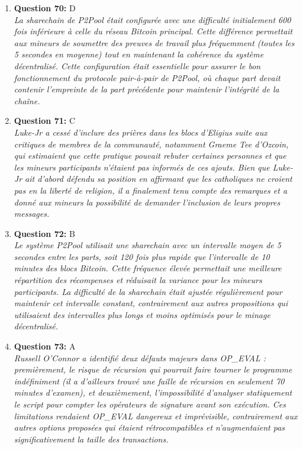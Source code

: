 \documentclass[12pt,a4paper]{article}
\begin{document}
\begin{enumerate}
\item \textbf{Question 70:} D
\\ \textit{La sharechain de P2Pool était configurée avec une difficulté initialement 600 fois inférieure à celle du réseau Bitcoin principal. Cette différence permettait aux mineurs de soumettre des preuves de travail plus fréquemment (toutes les 5 secondes en moyenne) tout en maintenant la cohérence du système décentralisé. Cette configuration était essentielle pour assurer le bon fonctionnement du protocole pair-à-pair de P2Pool, où chaque part devait contenir l'empreinte de la part précédente pour maintenir l'intégrité de la chaîne.}

\item \textbf{Question 71:} C
\\ \textit{Luke-Jr a cessé d'inclure des prières dans les blocs d'Eligius suite aux critiques de membres de la communauté, notamment Graeme Tee d'Ozcoin, qui estimaient que cette pratique pouvait rebuter certaines personnes et que les mineurs participants n'étaient pas informés de ces ajouts. Bien que Luke-Jr ait d'abord défendu sa position en affirmant que les catholiques ne croient pas en la liberté de religion, il a finalement tenu compte des remarques et a donné aux mineurs la possibilité de demander l'inclusion de leurs propres messages.}

\item \textbf{Question 72:} B
\\ \textit{Le système P2Pool utilisait une sharechain avec un intervalle moyen de 5 secondes entre les parts, soit 120 fois plus rapide que l'intervalle de 10 minutes des blocs Bitcoin. Cette fréquence élevée permettait une meilleure répartition des récompenses et réduisait la variance pour les mineurs participants. La difficulté de la sharechain était ajustée régulièrement pour maintenir cet intervalle constant, contrairement aux autres propositions qui utilisaient des intervalles plus longs et moins optimisés pour le minage décentralisé.}

\item \textbf{Question 73:} A
\\ \textit{Russell O'Connor a identifié deux défauts majeurs dans OP_EVAL : premièrement, le risque de récursion qui pourrait faire tourner le programme indéfiniment (il a d'ailleurs trouvé une faille de récursion en seulement 70 minutes d'examen), et deuxièmement, l'impossibilité d'analyser statiquement le script pour compter les opérateurs de signature avant son exécution. Ces limitations rendaient OP_EVAL dangereux et imprévisible, contrairement aux autres options proposées qui étaient rétrocompatibles et n'augmentaient pas significativement la taille des transactions.}


\end{enumerate}
\end{document}
